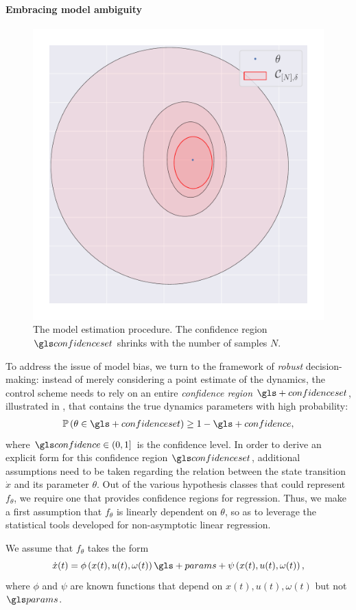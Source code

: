 \paragraph{Embracing model ambiguity}
\begin{figure}[ht]
	\centering
	\includegraphics[trim={1cm 0 0 0}, clip, width=0.5\linewidth]{img/ellipsoid}
	\caption{The model estimation procedure. The confidence region $\confidenceset$ shrinks with the number of samples $N$.}
	\label{fig:estimation}
\end{figure}
To address the issue of model bias, we turn to the framework of \emph{robust} decision-making: instead of merely considering a point estimate of the dynamics, the control scheme needs to rely on an entire \emph{confidence region} $\gls+{confidenceset}$, illustrated in , that contains the true dynamics parameters with high probability:
\begin{align}
\probability{\theta\in \gls+{confidenceset}} \geq 1-\gls+{confidence},
\label{eq:confidence}
\end{align}
where $\confidence\in(0,1]$ is the confidence level. 
In order to derive an explicit form for this confidence region $\confidenceset$, additional assumptions need to be taken regarding the relation between the state transition $\dot{x}$ and its parameter $\theta$. Out of the various hypothesis classes that could represent $f_\theta$, we require one that provides confidence regions for regression. Thus, we make a first assumption that $f_\theta$ is linearly dependent on $\theta$, so as to leverage the statistical tools developed for non-asymptotic linear regression.

\begin{assumption}
	\begin{leftbar}[assumptionbar]
	We assume that $f_\theta$ takes the form
	\begin{equation*}
	\dot{x}(t) = \phi\left(x(t),u(t),\omega(t)\right)\gls+{params} + \psi\left(x(t),u(t),\omega(t)\right),
	\end{equation*}
	where $\phi$ and $\psi$ are known functions that depend on $x(t),u(t),\omega(t)$ but not $\params$.
	\end{leftbar}
\end{assumption}

